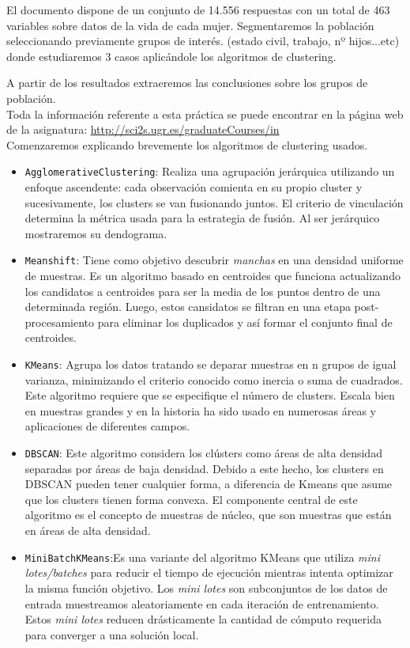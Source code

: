 	El documento dispone de un conjunto de 14.556 respuestas con un total de 463 variables sobre datos de la vida de cada mujer.
	Segmentaremos la población seleccionando previamente grupos de interés. (estado civil, trabajo, nº hijos...etc) donde estudiaremos 3 casos aplicándole los algoritmos de clustering. 
	
	A partir de los resultados extraeremos las conclusiones sobre los grupos de población. \\
	
	
	Toda la información referente a esta práctica se puede encontrar en la página web de la asignatura: \href{url}{http://sci2s.ugr.es/graduateCourses/in} \\
	
	Comenzaremos explicando brevemente los algoritmos de clustering usados.
	
	\begin{itemize}
		\item \texttt{AgglomerativeClustering}: Realiza una agrupación jerárquica utilizando un enfoque ascendente: cada observación comienta en su propio cluster y sucesivamente, los clusters se van fusionando juntos. El criterio de vinculación determina la métrica usada para la estrategia de fusión. Al ser jerárquico mostraremos su dendograma.
		\item \texttt{Meanshift}: Tiene como objetivo descubrir \textit{manchas} en una densidad uniforme de muestras. Es un algoritmo basado en centroides que funciona actualizando los candidatos a centroides para ser la media de los puntos dentro de una determinada región. Luego, estos cansidatos se filtran en una etapa post-procesamiento para eliminar los duplicados y así formar el conjunto final de centroides.
		\item \texttt{KMeans}: Agrupa los datos tratando se deparar muestras en n grupos de igual varianza, minimizando el criterio conocido como inercia o suma de cuadrados. Este algoritmo requiere que se especifique el número de clusters. Escala bien en muestras grandes y en la historia ha sido usado en numerosas áreas y aplicaciones de diferentes campos.
		\item \texttt{DBSCAN}: Este algoritmo considera los clústers como áreas de alta densidad separadas por áreas de baja densidad. Debido a este hecho, los clusters en DBSCAN pueden tener cualquier forma, a diferencia de Kmeans que asume que los clusters tienen forma convexa. El componente central de este algoritmo es el concepto de muestras de núcleo, que son muestras que están en áreas de alta densidad.
		\item \texttt{MiniBatchKMeans}:Es una variante del algoritmo KMeans que utiliza \textit{mini lotes/batches} para reducir el tiempo de ejecución mientras intenta optimizar la misma función objetivo. Los \textit{mini lotes} son subconjuntos de los datos de entrada muestreamos aleatoriamente en cada iteración de entrenamiento. Estos \textit{mini lotes} reducen drásticamente la cantidad de cómputo requerida para converger a una solución local. 
	\end{itemize}


